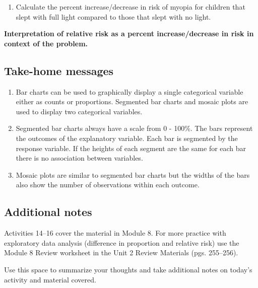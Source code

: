 \documentclass[
]{report}
\providecommand{\tightlist}{%
  \setlength{\itemsep}{0pt}\setlength{\parskip}{0pt}}
\begin{document}
\vspace{1in}

\begin{enumerate}
\def\labelenumi{\arabic{enumi}.}
\setcounter{enumi}{9}
\tightlist
\item
  Calculate the percent increase/decrease in risk of myopia for children that slept with full light compared to those that slept with no light.
\end{enumerate}

\vspace{0.8in}

\textbf{Interpretation of relative risk as a percent increase/decrease in risk in context of the problem.}

\vspace{1in}

\subsection{Take-home messages}\label{take-home-messages-14}

\begin{enumerate}
\def\labelenumi{\arabic{enumi}.}
\item
  Bar charts can be used to graphically display a single categorical variable either as counts or proportions. Segmented bar charts and mosaic plots are used to display two categorical variables.
\item
  Segmented bar charts always have a scale from 0 - 100\%. The bars represent the outcomes of the explanatory variable. Each bar is segmented by the response variable. If the heights of each segment are the same for each bar there is no association between variables.
\item
  Mosaic plots are similar to segmented bar charts but the widths of the bars also show the number of observations within each outcome.
\end{enumerate}

\subsection{Additional notes}\label{additional-notes-14}

Activities 14--16 cover the material in Module 8. For more practice with exploratory data analysis (difference in proportion and relative risk) use the Module 8 Review worksheet in the Unit 2 Review Materials (pgs. 255--256).

Use this space to summarize your thoughts and take additional notes on today's activity and material covered.
\end{document}
